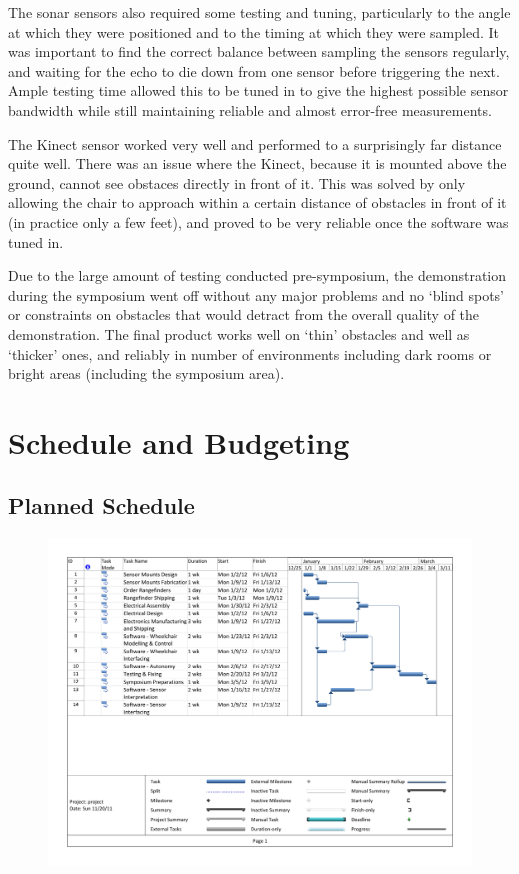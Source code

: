 \documentclass[oneside,final,a4paper]{report}
\begin{document}
The sonar sensors also required some testing and tuning, particularly to the angle at which they were positioned and to the timing at which they were sampled. It was important to find the correct balance between sampling the sensors regularly, and waiting for the echo to die down from one sensor before triggering the next. Ample testing time allowed this to be tuned in to give the highest possible sensor bandwidth while still maintaining reliable and almost error-free measurements.

The Kinect sensor worked very well and performed to a surprisingly far distance quite well. There was an issue where the Kinect, because it is mounted above the ground, cannot see obstaces directly in front of it. This was solved by only allowing the chair to approach within a certain distance of obstacles in front of it (in practice only a few feet), and proved to be very reliable once the software was tuned in.

Due to the large amount of testing conducted pre-symposium, the demonstration during the symposium went off without any major problems and no `blind spots' or constraints on obstacles that would detract from the overall quality of the demonstration. The final product works well on `thin' obstacles and well as `thicker' ones, and reliably in number of environments including dark rooms or bright areas (including the symposium area).

\chapter{Schedule and Budgeting}

\section{Planned Schedule}
\begin{figure}
 \centering
 \includegraphics[scale=0.6]{gantt} \label{fig:gantt}
\end{figure}
\end{document}
